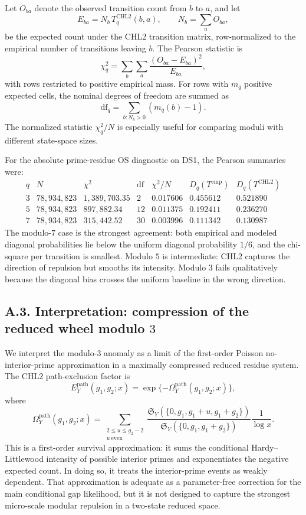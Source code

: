 \documentclass[10pt]{article}
\begin{document}
Let $O_{ba}$ denote the observed transition count from $b$ to $a$, and let
\[
E_{ba}=N_b\,T_q^{\mathrm{CHL2}}(b,a),
\qquad
N_b=\sum_a O_{ba},
\]
be the expected count under the CHL2 transition matrix, row-normalized to the empirical number of transitions leaving $b$.  The Pearson statistic is
\[
\chi_q^2=\sum_{b}\sum_{a}\frac{(O_{ba}-E_{ba})^2}{E_{ba}},
\]
with rows restricted to positive empirical mass.  For rows with $m_q$ positive expected cells, the nominal degrees of freedom are summed as
\[
\mathrm{df}_q=\sum_{b:N_b>0}(m_q(b)-1).
\]
The normalized statistic $\chi_q^2/N$ is especially useful for comparing moduli with different state-space sizes.

For the absolute prime-residue OS diagnostic on DS1, the Pearson summaries were:
\[
\begin{array}{c|r|r|r|r|r|r}
q & N & \chi^2 & \mathrm{df} & \chi^2/N & D_q(T^{\mathrm{emp}}) & D_q(T^{\mathrm{CHL2}})\\
\hline
3 & 78{,}934{,}823 & 1{,}389{,}703.35 & 2 & 0.017606 & 0.455612 & 0.521890\\
5 & 78{,}934{,}823 & 897{,}882.34 & 12 & 0.011375 & 0.192411 & 0.236270\\
7 & 78{,}934{,}823 & 315{,}442.52 & 30 & 0.003996 & 0.111342 & 0.130987
\end{array}
\]
The modulo-$7$ case is the strongest agreement: both empirical and modeled diagonal probabilities lie below the uniform diagonal probability $1/6$, and the chi-square per transition is smallest.  Modulo $5$ is intermediate: CHL2 captures the direction of repulsion but smooths its intensity.  Modulo $3$ fails qualitatively because the diagonal bias crosses the uniform baseline in the wrong direction.

\subsection*{A.3. Interpretation: compression of the reduced wheel modulo $3$}

We interpret the modulo-$3$ anomaly as a limit of the first-order Poisson no-interior-prime approximation in a maximally compressed reduced residue system.  The CHL2 path-exclusion factor is
\[
E_Y^{\mathrm{path}}(g_1,g_2;x)=\exp\{-\Omega_Y^{\mathrm{path}}(g_1,g_2;x)\},
\]
where
\[
\Omega_Y^{\mathrm{path}}(g_1,g_2;x)=\sum_{\substack{2\le u\le g_2-2\\ u\ \mathrm{even}}}\frac{\mathfrak S_Y(\{0,g_1,g_1+u,g_1+g_2\})}{\mathfrak S_Y(\{0,g_1,g_1+g_2\})}\frac{1}{\log x}.
\]
This is a first-order survival approximation: it sums the conditional Hardy--Littlewood intensity of possible interior primes and exponentiates the negative expected count.  In doing so, it treats the interior-prime events as weakly dependent.  That approximation is adequate as a parameter-free correction for the main conditional gap likelihood, but it is not designed to capture the strongest micro-scale modular repulsion in a two-state reduced space.
\end{document}
